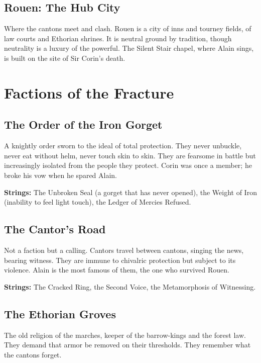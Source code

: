 \documentclass[11pt,twoside]{book}
\begin{document}
\section{Rouen: The Hub City}
Where the cantons meet and clash. Rouen is a city of inns and tourney fields, of law courts and Ethorian shrines. It is neutral ground by tradition, though neutrality is a luxury of the powerful. The Silent Stair chapel, where Alain sings, is built on the site of Sir Corin's death.
\chapter{Factions of the Fracture}\label{ch:factions}

\section{The Order of the Iron Gorget}
A knightly order sworn to the ideal of total protection.  They never unbuckle, never eat without helm, never touch skin to skin.  They are fearsome in battle but increasingly isolated from the people they protect.  Corin was once a member; he broke his vow when he spared Alain.

\textbf{Strings:} The Unbroken Seal (a gorget that has never opened), the Weight of Iron (inability to feel light touch), the Ledger of Mercies Refused.

\section{The Cantor's Road}
Not a faction but a calling.  Cantors travel between cantons, singing the news, bearing witness.  They are immune to chivalric protection but subject to its violence.  Alain is the most famous of them, the one who survived Rouen.

\textbf{Strings:} The Cracked Ring, the Second Voice, the Metamorphosis of Witnessing.

\section{The Ethorian Groves}
The old religion of the marches, keeper of the barrow-kings and the forest law.  They demand that armor be removed on their thresholds.  They remember what the cantons forget.
\end{document}
